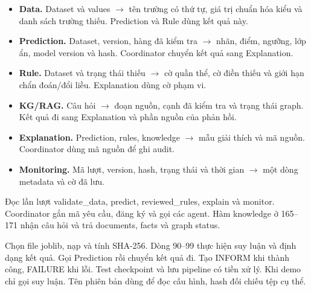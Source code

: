 \begin{itemize}
\item \textbf{Data.} Dataset và values \(\to\) tên trường có thứ tự, giá trị chuẩn hóa kiểu và danh sách trường thiếu. Prediction và Rule dùng kết quả này.
\item \textbf{Prediction.} Dataset, version, hàng đã kiểm tra \(\to\) nhãn, điểm, ngưỡng, lớp ẩn, model version và hash. Coordinator chuyển kết quả sang Explanation.
\item \textbf{Rule.} Dataset và trạng thái thiếu \(\to\) cờ quần thể, cờ điền thiếu và giới hạn chẩn đoán/đổi liều. Explanation dùng cờ phạm vi.
\item \textbf{KG/RAG.} Câu hỏi \(\to\) đoạn nguồn, cạnh đã kiểm tra và trạng thái graph. Kết quả đi sang Explanation và phần nguồn của phản hồi.
\item \textbf{Explanation.} Prediction, rules, knowledge \(\to\) mẫu giải thích và mã nguồn. Coordinator dùng mã nguồn để ghi audit.
\item \textbf{Monitoring.} Mã lượt, version, hash, trạng thái và thời gian \(\to\) một dòng metadata và cờ đã lưu.
\end{itemize}
 Đọc lần lượt validate\_data, predict, reviewed\_rules, explain và monitor.
 Coordinator gắn mã yêu cầu, đăng ký và gọi các agent. Hàm knowledge ở 165--171 nhận câu hỏi và trả documents, facts và graph status.

 Chọn file joblib, nạp và tính SHA-256. Dòng 90--99 thực hiện suy luận và định dạng kết quả.
 Gọi Prediction rồi chuyển kết quả đi.  Tạo INFORM khi thành công, FAILURE khi lỗi.
 Test checkpoint và lưu pipeline có tiền xử lý. Khi demo chỉ gọi suy luận. Tên phiên bản dùng để đọc cấu hình, hash đối chiếu tệp cụ thể.

